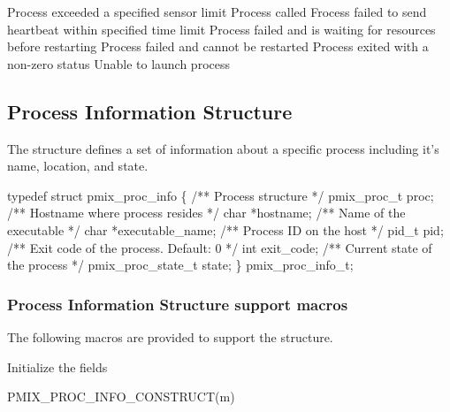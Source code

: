 \begin{constantdesc}
%
Process exceeded a specified sensor limit
%
Process called 
%
Frocess failed to send heartbeat within specified time limit
%
Process failed and is waiting for resources before restarting
%
Process failed and cannot be restarted
%
Process exited with a non-zero status
%
Unable to launch process
%
\end{constantdesc}


\subsection{Process Information Structure}

The  structure defines a set of information about a specific process including it's name, location, and state.

\cspecificstart
\begin{codepar}
typedef struct pmix_proc_info \{
    /** Process structure */
    pmix_proc_t proc;
    /** Hostname where process resides */
    char *hostname;
    /** Name of the executable */
    char *executable_name;
    /** Process ID on the host */
    pid_t pid;
    /** Exit code of the process. Default: 0 */
    int exit_code;
    /** Current state of the process */
    pmix_proc_state_t state;
\} pmix_proc_info_t;
\end{codepar}
\cspecificend


\subsubsection{Process Information Structure support macros}

The following macros are provided to support the  structure.


Initialize the  fields

\cspecificstart
\begin{codepar}
PMIX_PROC_INFO_CONSTRUCT(m)
\end{codepar}
\cspecificend


